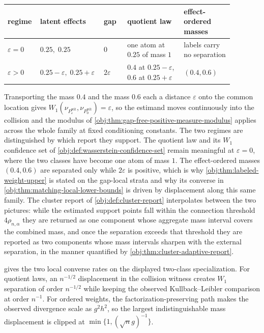 \begin{center}
\small
\begin{tabular}{p{0.13\linewidth}p{0.20\linewidth}p{0.10\linewidth}p{0.24\linewidth}p{0.21\linewidth}}
regime & latent effects & gap & quotient law & effect-ordered masses\\
\hline
\(\varepsilon=0\) & \(0.25,\;0.25\) & \(0\) & one atom at \(0.25\) of mass \(1\) & labels carry no separation\\
\(\varepsilon>0\) & \(0.25-\varepsilon,\;0.25+\varepsilon\) & \(2\varepsilon\) & \(0.4\) at \(0.25-\varepsilon\), \(0.6\) at \(0.25+\varepsilon\) & \((0.4,0.6)\)\\
\end{tabular}
\end{center}

Transporting the mass \(0.4\) and the mass \(0.6\) each a distance \(\varepsilon\) onto the common location gives \(W_1(\nu_{P^{\mathrm{wit}}_{\varepsilon}},\nu_{P^{\mathrm{wit}}_{0}})=\varepsilon\), so the estimand moves continuously into the collision and the modulus of \cref{obj:thm:gap-free-positive-measure-modulus} applies across the whole family at fixed conditioning constants. The two regimes are distinguished by which report they support. The quotient law and its \(W_1\) confidence set of \cref{obj:def:wasserstein-confidence-set} remain meaningful at \(\varepsilon=0\), where the two classes have become one atom of mass \(1\). The effect-ordered masses \((0.4,0.6)\) are separated only while \(2\varepsilon\) is positive, which is why \cref{obj:thm:labeled-weight-upper} is stated on the gap-local strata and why its converse in \cref{obj:thm:matching-local-lower-bounds} is driven by displacement along this same family. The cluster report of \cref{obj:def:cluster-report} interpolates between the two pictures: while the estimated support points fall within the connection threshold \(4\rho_{n,\alpha}\) they are returned as one component whose aggregate mass interval covers the combined mass, and once the separation exceeds that threshold they are reported as two components whose mass intervals sharpen with the external separation, in the manner quantified by \cref{obj:thm:cluster-adaptive-report}.


 gives the two local converse rates on the displayed two-class specialization. For quotient laws, an \(n^{-1/2}\) displacement in the collision witness creates \(W_1\) separation of order \(n^{-1/2}\) while keeping the observed Kullback--Leibler comparison at order \(n^{-1}\). For ordered weights, the factorization-preserving path makes the observed divergence scale as \(g^2h^2\), so the largest indistinguishable mass displacement is clipped at \(\min\{1,(\sqrt n g)^{-1}\}\).

